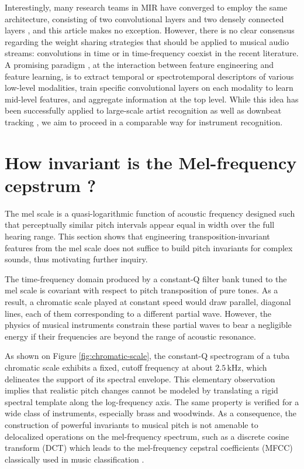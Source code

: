 \documentclass{article}
\begin{document}
Interestingly, many research teams in MIR have converged to employ the same
architecture, consisting of two convolutional layers and two densely connected layers
\cite{Dieleman2014, Humphrey2012tonnetz,
Kereliuk2015, Li2015, McFee2015-muda, Schluter2014, Ullrich2014}, and this
article makes no exception.
However, there is no clear consensus regarding the
weight sharing strategies that should be applied to musical audio streams:
convolutions in time or in time-frequency coexist in the recent literature.
A promising paradigm \cite{Dieleman2011, Durand2016}, at the interaction
between feature engineering and feature learning, is to extract
temporal or spectrotemporal descriptors of various low-level modalities,
train specific convolutional layers on each modality
to learn mid-level features, and aggregate information at the top level.
While this idea has been successfully applied to large-scale artist
recognition \cite{Dieleman2011} as well as downbeat tracking
\cite{Durand2016}, we aim to proceed in a comparable way for instrument
recognition.

\section{How invariant is the Mel-frequency cepstrum ?}
The mel scale is a quasi-logarithmic function of acoustic frequency designed such that
perceptually similar pitch intervals appear equal in width over the full hearing range.
This section shows that engineering transposition-invariant features from the mel
scale does not suffice to build pitch invariants for complex sounds, thus motivating
further inquiry.

The time-frequency domain produced by a constant-Q filter bank tuned to the mel
scale is covariant with respect to pitch transposition of pure tones.
As a result, a chromatic scale played at constant speed would draw parallel,
diagonal lines, each of them corresponding to a different partial wave.
However, the physics of musical instruments constrain these partial waves to bear
a negligible energy if their frequencies are beyond the range of acoustic resonance.

As shown on Figure \ref{fig:chromatic-scale}, the constant-Q spectrogram of a
tuba chromatic scale exhibits a fixed,
cutoff frequency at about $2.5\,\mathrm{kHz}$, which
delineates the support of its spectral envelope.
This elementary observation implies that realistic pitch changes cannot be modeled
by translating a rigid spectral template along the log-frequency axis.
The same property is verified for a wide class of instruments, especially brass and
woodwinds.
As a consequence, the construction of powerful invariants to musical pitch is not
amenable to delocalized operations on the mel-frequency spectrum, such as a
discrete cosine transform (DCT) which leads to the mel-frequency cepstral
coefficients (MFCC) classically used in music classification
\cite{Eronen2000, Joder2009}.
\end{document}
